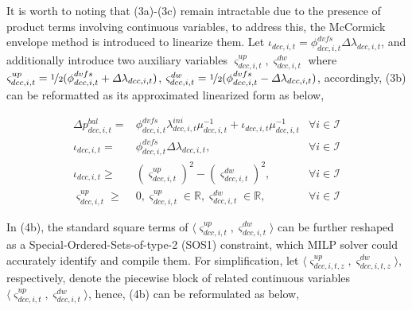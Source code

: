 \documentclass[lettersize,journal]{IEEEtran}
\begin{document}

It is worth to noting that (3a)-(3c) remain intractable due to the presence of product terms involving continuous variables, to address this, the McCormick envelope method is introduced to linearize them. Let $\iota_{dcc,i,t} = \phi_{dcc,i,t}^{dvfs} \varDelta \lambda_{dcc,i,t}$, and additionally introduce two auxiliary variables $\varsigma_{dcc,i,t}^{up}, \varsigma_{dcc,i,t}^{dw}$ where $\varsigma_{dcc,i,t}^{up} = \nicefrac{1}{2}(\phi_{dcc,i,t}^{dvfs} + \varDelta \lambda_{dcc,i,t}) $, $\varsigma_{dcc,i,t}^{dw} = \nicefrac{1}{2}(\phi_{dcc,i,t}^{dvfs} - \varDelta \lambda_{dcc,i,t}) $, accordingly, (3b) can be reformatted as its approximated linearized form as below,

\vspace{-0.25cm}
\begin{subequations}
  \begin{align}
    \!\!\!\!\!\!\!\!\varDelta p_{dcc,i,t}^{bal} = &\phi_{dcc,i,t}^{dvfs} \lambda_{dcc,i,t}^{ini}{\mu_{dcc,i,t}^{-1}} + \iota_{dcc,i,t} {\mu_{dcc,i,t}^{-1}} & \forall i\in \mathcal{I} \\
    \!\!\!\!\!\!\!\!\iota_{dcc,i,t} =&\phi_{dcc,i,t}^{dvfs} \varDelta \lambda_{dcc,i,t}, & \forall i\in \mathcal{I}\\
    \!\!\!\!\!\!\!\!\iota_{dcc,i,t} \geq &(\varsigma_{dcc,i,t}^{up})^{2} - (\varsigma_{dcc,i,t}^{dw})^{2},& \forall i\in \mathcal{I}\\
    \!\!\!\!\!\!\!\!\varsigma_{dcc,i,t}^{up} \geq & 0, \varsigma_{dcc,i,t}^{up} \in \mathbb{R}, \varsigma_{dcc,i,t}^{dw} \in \mathbb{R},& \forall i\in \mathcal{I}
  \end{align}
\end{subequations}

In (4b), the standard square terms of $\langle \varsigma_{dcc,i,t}^{up},\varsigma_{dcc,i,t}^{dw}\rangle $ can be further reshaped as a Special-Ordered-Sets-of-type-2 (SOS1) constraint, which MILP solver could accurately identify and compile them. For simplification, let $\langle \varsigma_{dcc,i,t,z}^{up}, \varsigma_{dcc,i,t,z}^{dw}\rangle$, respectively, denote the piecewise block of related continuous variables $\langle \varsigma_{dcc,i,t}^{up},\varsigma_{dcc,i,t}^{dw}\rangle$, hence, (4b) can be reformulated as below,
\end{document}
